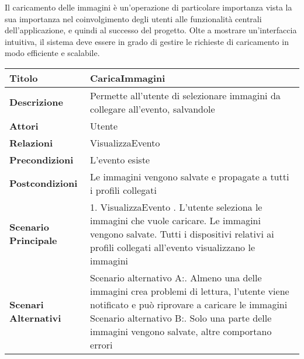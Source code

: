 Il caricamento delle immagini è un'operazione di particolare importanza vista la sua importanza
nel coinvolgimento degli utenti alle funzionalità centrali dell'applicazione, e quindi al successo del progetto.
Olte a mostrare un'interfaccia intuitiva, il sistema deve essere in grado di gestire le richieste di caricamento in modo efficiente e scalabile.\\
\clearpage

\begin{table}[htb]
    \begin{tabular} {|P{4.5cm}|P{11cm}|}
        \hline
        \textbf{Titolo}                   & CaricaImmagini                                                                  \\
        \hline
        \textbf{Descrizione}              & Permette all'utente di selezionare immagini da collegare all'evento, salvandole \\
        \hline
        \textbf{Attori}                   & Utente                                                                          \\
        \hline
        \textbf{Relazioni}                & VisualizzaEvento                                                                \\
        \hline
        \textbf{Precondizioni}            & L'evento esiste                                                                 \\
        \hline
        \textbf{Postcondizioni}           & Le immagini vengono salvate e propagate a tutti i profili collegati             \\
        \hline
        \textbf{Scenario Principale}      & 1. VisualizzaEvento . L'utente seleziona le immagini che vuole caricare. Le immagini vengono salvate. Tutti i dispositivi relativi ai profili collegati all'evento visualizzano le immagini                            \\
        \hline
        \textbf{Scenari Alternativi}      &
        Scenario alternativo A:. Almeno una delle immagini crea problemi di lettura,
        l'utente viene notificato e può riprovare a caricare le immagini\newline
        Scenario alternativo B:. Solo una parte delle immagini vengono salvate, altre comportano errori\newline

\end{tabular}
\end{table}

